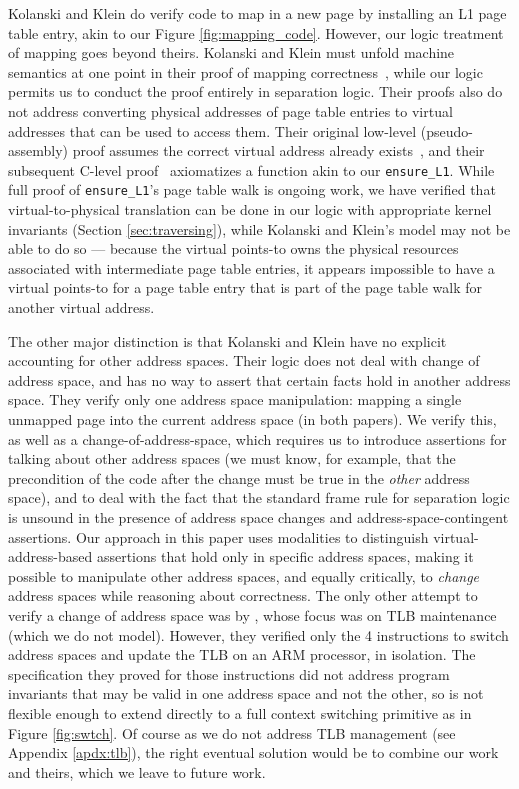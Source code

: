 Kolanski and Klein do verify code to map in a new page by installing an L1 page table entry, akin to our Figure \ref{fig:mapping_code}.
However, our logic treatment of mapping goes beyond theirs. 
Kolanski and Klein must unfold machine semantics at one point in their proof of mapping correctness~\cite[p.~27]{kolanski08vstte}, while
our logic permits us to conduct the proof entirely in separation logic.
Their proofs also do not address
converting physical addresses of page table entries to virtual addresses that can be used to access them.
Their original low-level (pseudo-assembly) proof assumes the correct virtual address already exists~\cite{kolanski08vstte},
and their subsequent C-level proof~\cite{kolanski09tphols} axiomatizes a function akin to our \lstinline|ensure_L1|.
While full proof of \lstinline|ensure_L1|'s page table walk is ongoing work, we have verified that virtual-to-physical
translation can be done in our logic with appropriate kernel invariants (Section \ref{sec:traversing}), while
Kolanski and Klein's model may not be able to do so --- because the virtual points-to owns the physical resources associated with
intermediate page table entries, it appears impossible to have a virtual points-to for a page table entry that is part of the
page table walk for another virtual address.

The other major distinction is that Kolanski and Klein have no explicit accounting for other address spaces.
Their logic does not deal with change of address space, and has no way to assert that certain facts hold
in another address space.
They verify only one address space manipulation: mapping a single unmapped page into the current address space (in both papers).
We verify this, as well as a change-of-address-space, which requires us to introduce assertions for talking
about other address spaces (we must know, for example, that the precondition of the code after the change must be true
in the \emph{other} address space), and to deal with the fact that the standard frame rule
for separation logic is unsound in the presence of address space changes and address-space-contingent assertions.
Our approach in this paper uses modalities to distinguish virtual-address-based assertions that hold only in specific 
address spaces, making it possible to manipulate other address spaces, and equally critically, to \emph{change} address 
spaces while reasoning about correctness.
The only other attempt to verify a change of address space was by \citet{syeda2018program,syeda2020formal}, whose focus was on TLB maintenance (which we
do not model). However, they verified only the 4 instructions to switch address spaces and update the TLB on an ARM processor, in isolation.
The specification they proved for those instructions did not address program invariants that may be valid in one address space and not the other,
so is not flexible enough to extend directly to a full context switching primitive as in Figure \ref{fig:swtch}.
Of course as we do not address TLB management (see Appendix \ref{apdx:tlb}), the right eventual solution would be to combine our work
and theirs, which we leave to future work.


